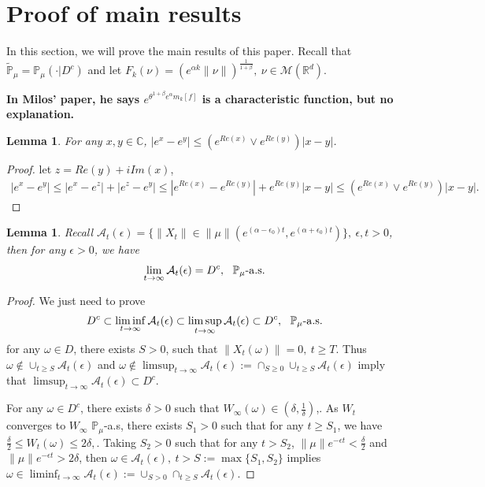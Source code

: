 \documentclass[12pt,oneside,english]{amsart}
\theoremstyle{plain}
\newtheorem{lem}[thm]{Lemma}
\theoremstyle{definition}
\numberwithin{equation}{section}
\begin{document}
\section{Proof of main results}

In this section, we will prove the main results of this paper. Recall that $\mathbb{\tilde{P}}_{\mu}=\mathbb{P}_{\mu}(\cdot|D^c)$ and let $F_k(\nu)=\left(e^{\alpha k}\|\nu\|\right)^{\frac{1}{1+\beta}},~ \nu\in \mathcal{M}(\mathbb{R}^d)$.

{\bf In Milos' paper, he says $e^{\theta^{1+\beta}e^{\alpha}m_k[f]}$ is a characteristic function, but no explanation.}
\begin{lem}\label{lemma31}
For any $x,y\in \mathbb{C}$, $|e^x-e^y|\leq (e^{Re(x)}\vee e^{Re(y)})|x-y|$.
\end{lem}
\begin{proof}
let $z=Re(y)+iIm(x)$,
\begin{align}\label{estim}
    |e^x-e^y|\leq|e^x-e^z|+|e^z-e^y|\leq |e^{Re(x)}-e^{Re(y)}|+e^{Re(y)}|x-y|\leq (e^{Re(x)}\vee e^{Re(y)})|x-y|.
\end{align}
\end{proof}
\begin{lem}\label{lemma32}
Recall $\mathcal{A}_t(\epsilon)=\{\|X_t\|\in\|\mu\|(e^{(\alpha-\epsilon_0)t},e^{(\alpha+\epsilon_0)t})\},~\epsilon,t>0$, then for any $\epsilon>0$, we have
\begin{align}
    \lim_{t\rightarrow\infty}\mathcal{A}_t(\epsilon)=D^c, ~~\mathbb{P}_{\mu}\text{-}{\rm a.s}.
\end{align}
\end{lem}
\begin{proof}
    We just need to prove 
    \begin{align}
        D^c \subset \liminf_{t\rightarrow\infty}\mathcal{A}_t(\epsilon)\subset \limsup_{t\rightarrow\infty}\mathcal{A}_t(\epsilon)\subset D^c,~~\mathbb{P}_{\mu}\text{-}{\rm a.s}.
    \end{align}
    for any $\omega\in D$, there exists $S>0$, such that $\|X_t(\omega)\|=0,~t\geq T$. Thus $\omega \notin \cup_{t\geq S}\mathcal{A}_t(\epsilon)$ and $\omega\notin  \limsup_{t\rightarrow\infty}\mathcal{A}_t(\epsilon):=\cap_{S\geq 0}\cup_{t\geq S}\mathcal{A}_t(\epsilon)$ imply that $\limsup_{t\rightarrow\infty}\mathcal{A}_t(\epsilon)\subset D^c$.
    
    For any $\omega \in D^c$, there exists $\delta>0$ such that $W_{\infty}(\omega)\in(\delta,\frac{1}{\delta})$,. As $W_t$ converges to $W_{\infty}$ $\mathbb{P}_{\mu}$-a.s, there exists $S_1>0$ such that for any $t\geq S_1$, we have $\frac{\delta}{2}\leq W_t(\omega)\leq 2\delta,$. Taking $S_2>0$ such that for any $t>S_2$, $\|\mu\|e^{-\epsilon t}<\frac{\delta}{2}$ and $\|\mu\|e^{-\epsilon t}>2\delta$, then $\omega\in \mathcal{A}_t(\epsilon),~t>S:=\max\{S_1,S_2\}$ implies $\omega \in \liminf_{t\rightarrow \infty}\mathcal{A}_t(\epsilon):=\cup_{S>0}\cap_{t\geq S}\mathcal{A}_t(\epsilon)$.
\end{proof}
\end{document}
